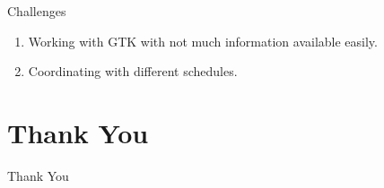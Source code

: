 \documentclass{beamer}
\begin{document}
\begin{frame}{Challenges}
    \begin{enumerate}
        \item Working with GTK with not much information available easily.
        \item Coordinating with different schedules.
    \end{enumerate}
\end{frame}

\section{Thank You}

\begin{frame}{ }
    \begin{center}
        \LARGE
        Thank You
    \end{center}
\end{frame}
\end{document}

